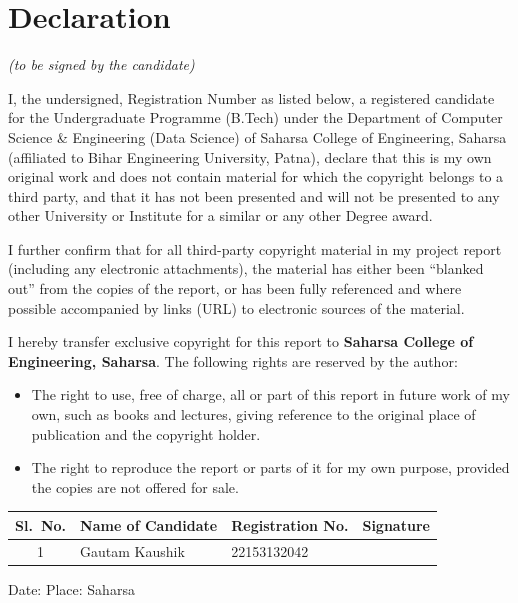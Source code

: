 \documentclass[12pt, a4paper, oneside]{report}
\begin{document}
\chapter*{Declaration}
\thispagestyle{plain}
{

\textit{(to be signed by the candidate)}

\vspace{0.3cm}

I, the undersigned, Registration Number as listed below, a registered candidate for the Undergraduate Programme (B.Tech) under the Department of Computer Science \& Engineering (Data Science) of Saharsa College of Engineering, Saharsa (affiliated to Bihar Engineering University, Patna), declare that this is my own original work and does not contain material for which the copyright belongs to a third party, and that it has not been presented and will not be presented to any other University or Institute for a similar or any other Degree award.

I further confirm that for all third-party copyright material in my project report (including any electronic attachments), the material has either been ``blanked out'' from the copies of the report, or has been fully referenced and where possible accompanied by links (URL) to electronic sources of the material.

I hereby transfer exclusive copyright for this report to \textbf{Saharsa College of Engineering, Saharsa}. The following rights are reserved by the author:

\begin{itemize}[leftmargin=*, itemsep=0pt, parsep=2pt, topsep=2pt]
\item The right to use, free of charge, all or part of this report in future work of my own, such as books and lectures, giving reference to the original place of publication and the copyright holder.
\item The right to reproduce the report or parts of it for my own purpose, provided the copies are not offered for sale.
\end{itemize}

\vspace{0.3cm}

\begin{center}
\renewcommand{\arraystretch}{1.5}
\begin{tabular}{|c|p{4.5cm}|p{3.2cm}|p{3.0cm}|}
\hline
\textbf{Sl.\ No.} & \textbf{Name of Candidate} & \textbf{Registration No.} & \textbf{Signature} \\ \hline
1 & Gautam Kaushik  & 22153132042 & \\ \hline
\end{tabular}
\renewcommand{\arraystretch}{1.0}
\end{center}

\vspace{0.5cm}
\noindent Date: \hrulefill \hfill Place: Saharsa
}%
\end{document}
